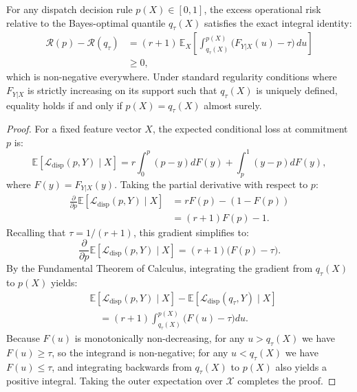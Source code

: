 \begin{lemma}
\label{lem:excess_risk}
For any dispatch decision rule $p(X) \in [0, 1]$, the excess operational risk relative to the Bayes-optimal quantile $q_\tau(X)$ satisfies the exact integral identity:
\begin{equation}
\begin{aligned}
\mathcal{R}(p) - \mathcal{R}(q_\tau) &= (r + 1) \, \mathbb{E}_X \left[ \int_{q_\tau(X)}^{p(X)} \Big( F_{Y|X}(u) - \tau \Big) \, du \right] \\
&\ge 0,
\end{aligned}
\label{eq:exact_integral}
\end{equation}
which is non-negative everywhere. Under standard regularity conditions where $F_{Y|X}$ is strictly increasing on its support such that $q_\tau(X)$ is uniquely defined, equality holds if and only if $p(X) = q_\tau(X)$ almost surely.
\end{lemma}

\begin{proof}
For a fixed feature vector $X$, the expected conditional loss at commitment $p$ is:
\begin{equation}
\mathbb{E}[ \mathcal{L}_{\text{disp}}(p, Y) \mid X ] = r \int_0^p (p - y) dF(y) + \int_p^1 (y - p) dF(y),
\end{equation}
where $F(y) = F_{Y|X}(y)$. Taking the partial derivative with respect to $p$:
\begin{equation}
\begin{aligned}
\frac{\partial}{\partial p} \mathbb{E}[ \mathcal{L}_{\text{disp}}(p, Y) \mid X ] &= r F(p) - (1 - F(p)) \\
&= (r + 1) F(p) - 1.
\end{aligned}
\end{equation}
Recalling that $\tau = 1 / (r+1)$, this gradient simplifies to:
\begin{equation}
\frac{\partial}{\partial p} \mathbb{E}[ \mathcal{L}_{\text{disp}}(p, Y) \mid X ] = (r + 1) \Big( F(p) - \tau \Big).
\end{equation}
By the Fundamental Theorem of Calculus, integrating the gradient from $q_\tau(X)$ to $p(X)$ yields:
\begin{equation}
\begin{aligned}
&\mathbb{E}[ \mathcal{L}_{\text{disp}}(p, Y) \mid X ] - \mathbb{E}[ \mathcal{L}_{\text{disp}}(q_\tau, Y) \mid X ] \\
&\quad = (r+1) \int_{q_\tau(X)}^{p(X)} \Big( F(u) - \tau \Big) du.
\end{aligned}
\end{equation}
Because $F(u)$ is monotonically non-decreasing, for any $u > q_\tau(X)$ we have $F(u) \ge \tau$, so the integrand is non-negative; for any $u < q_\tau(X)$ we have $F(u) \le \tau$, and integrating backwards from $q_\tau(X)$ to $p(X)$ also yields a positive integral. Taking the outer expectation over $\mathcal{X}$ completes the proof.
\end{proof}

